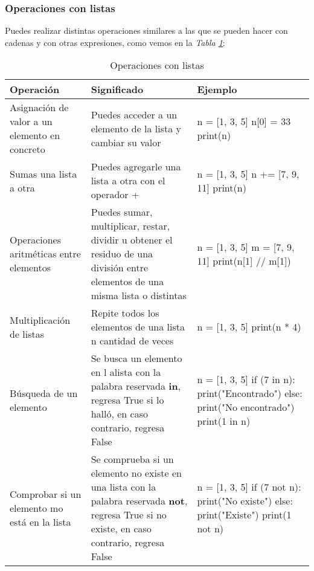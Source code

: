 \subsubsection{Operaciones con listas}
\hspace{0.55cm}Puedes realizar distintas operaciones similares a las que se pueden hacer con cadenas y con otras expresiones, como vemos en la \textit{Tabla \ref{tab: 7}}:
\begin{table}[H]
    \begin{center}
        \caption{Operaciones con listas}
        \label{tab: 7}
        \begin{tabular}{m{4cm} m{5cm} m{4cm}}
            \hline
            \textbf{Operación} & \textbf{Significado} & \textbf{Ejemplo} \\
            \hline
            Asignación de valor a un elemento en concreto		& Puedes acceder a un elemento de la lista y cambiar su valor		& n = [1, 3, 5] n[0] = 33 print(n) \\
            Sumas una lista a otra								& Puedes agregarle una lista a otra con el operador +				& n = [1, 3, 5] n += [7, 9, 11] print(n) \\
            Operaciones aritméticas entre elementos			& Puedes sumar, multiplicar, restar, dividir u obtener el residuo de una división entre elementos de una misma lista o distintas							& n = [1, 3, 5] m = [7, 9, 11] print(n[1] // m[1]) \\
            Multiplicación de listas							& Repite todos los elementos de una lista n cantidad de veces		& n = [1, 3, 5] print(n * 4) \\
            Búsqueda de un elemento								& Se busca un elemento en l alista con la palabra reservada \textbf{in}, regresa True si lo halló, en caso contrario, regresa False						& n = [1, 3, 5] if (7 in n): print("Encontrado") else: print("No encontrado") print(1 in n) \\
            Comprobar si un elemento mo está en la lista			& Se comprueba si un elemento no existe en una lista con la palabra reservada \textbf{not}, regresa True si no existe, en caso contrario, regresa False	& n = [1, 3, 5] if (7 not n): print("No existe") else: print("Existe") print(1 not n) \\
            \hline
        \end{tabular}
    \end{center}    
\end{table}


